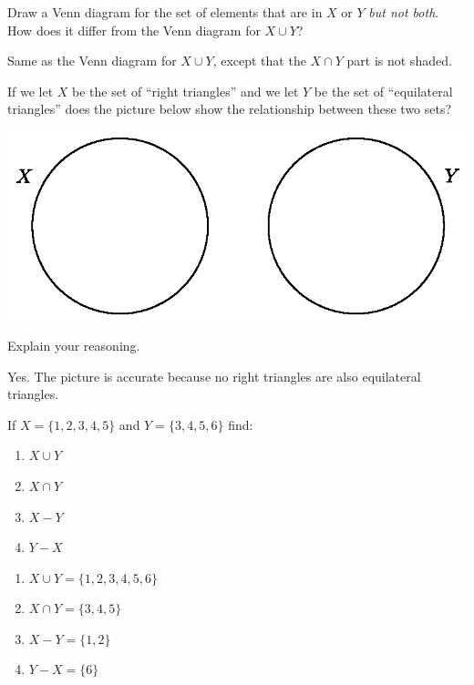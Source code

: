 \documentclass{ximera}
\begin{document}
\begin{problem}
Draw a Venn diagram for the set of elements that are in $X$ or $Y$ \emph{but not both}. 
How does it differ from the Venn diagram for $X\cup Y$?  
\begin{freeResponse}
Same as the Venn diagram for $X\cup Y$, except that the $X\cap Y$ part is not shaded.  
\end{freeResponse}
\end{problem}

\begin{problem}
If we let $X$ be the set of ``right triangles'' and we let $Y$ be the set of ``equilateral triangles'' does the picture below show the relationship between these two sets?
\begin{image}
  \includegraphics[scale=0.8]{set4.png}
\end{image}
Explain your reasoning.
\begin{freeResponse}
Yes.  The picture is accurate because no right triangles are also equilateral triangles.  
\end{freeResponse}
\end{problem}

\begin{problem}
If $X = \{1,2,3,4,5\}$ and $Y = \{3,4,5,6\}$ find:
\begin{enumerate}
\item $X\cup Y$
\item $X\cap Y$
\item $X-Y$
\item $Y-X$
\end{enumerate}
\begin{freeResponse}
\begin{enumerate}
\item $X\cup Y = \{1,2,3,4,5,6\}$
\item $X\cap Y = \{3,4,5\}$
\item $X-Y = \{1,2\}$
\item $Y-X = \{6\}$
\end{enumerate}
\end{freeResponse}
\end{problem}
\end{document}
